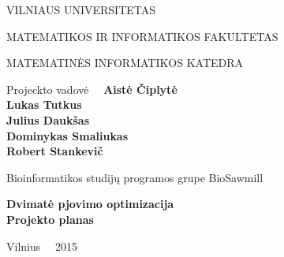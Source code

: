 \documentclass[a4paper,12pt]{article}
\begin{document}
\renewcommand{\cftdot}{.}	
\renewcommand{\cftsecleader}{\cftdotfill{\cftdotsep}}

\thispagestyle{empty} %


\begin{center}
 VILNIAUS UNIVERSITETAS 
 
MATEMATIKOS IR INFORMATIKOS FAKULTETAS

MATEMATINĖS INFORMATIKOS KATEDRA

\vspace{4cm}

Projeckto vadovė \ \ \textbf{Aistė Čiplytė} \\
\textbf{Lukas Tutkus} \\
\textbf{Julius Daukšas} \\
\textbf{Dominykas Smaliukas} \\
\textbf{Robert Stankevič} \\

\vspace{0.2cm}

Bioinformatikos studijų programos grupe BioSawmill



\vspace{3cm}
\textbf{\Large Dvimatė pjovimo optimizacija}\\
\textbf{\Large Projekto planas}

\vfill

Vilnius \ \  2015
\end{center}



\clearpage

\tableofcontents
\clearpage
\end{document}
